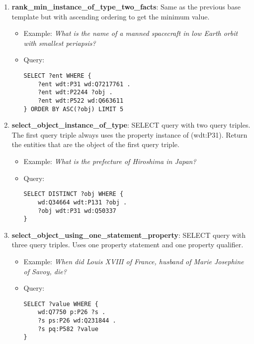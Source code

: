 \begin{enumerate}
    \item \textbf{rank\_min\_instance\_of\_type\_two\_facts}: Same as the previous base template but with 
    ascending ordering to get the minimum value.
    \begin{itemize}
        \item Example: \textit{What is the name of a manned spacecraft in low Earth orbit with 
        smallest periapsis?}
        \item Query:
        \begin{lstlisting}[basicstyle=\ttfamily,frame=single]        
SELECT ?ent WHERE { 
    ?ent wdt:P31 wd:Q7217761 . 
    ?ent wdt:P2244 ?obj . 
    ?ent wdt:P522 wd:Q663611
} ORDER BY ASC(?obj) LIMIT 5
        \end{lstlisting}
    \end{itemize}
    
    \item \textbf{select\_object\_instance\_of\_type}: SELECT query with two query triples. The first 
    query triple always uses the property instance of (wdt:P31). Return the entities that are the 
    object of the first query triple.
    \begin{itemize}
        \item Example: \textit{What is the prefecture of Hiroshima in Japan?}
        \item Query:
        \begin{lstlisting}[basicstyle=\ttfamily,frame=single]        
SELECT DISTINCT ?obj WHERE { 
    wd:Q34664 wdt:P131 ?obj . 
    ?obj wdt:P31 wd:Q50337 
}
        \end{lstlisting}
    \end{itemize}
    
    \item \textbf{select\_object\_using\_one\_statement\_property}: SELECT query with three query triples. 
    Uses one property statement and one property qualifier. 
    \begin{itemize}
        \item Example: \textit{When did Louis XVIII of France, husband of Marie Josephine of Savoy, 
        die?}
        \item Query:
        \begin{lstlisting}[basicstyle=\ttfamily,frame=single]        
SELECT ?value WHERE { 
    wd:Q7750 p:P26 ?s . 
    ?s ps:P26 wd:Q231844 . 
    ?s pq:P582 ?value
}
        \end{lstlisting}
    \end{itemize}
    

\end{enumerate}
